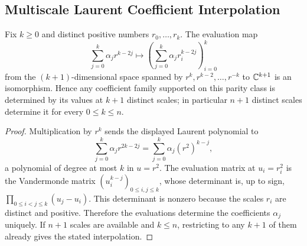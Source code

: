 \subsection{Multiscale Laurent Coefficient Interpolation}\label{subsec:multiscale-coefficient-vector-inverse}

\begin{lemma}\label{lem:parity-restricted-laurent-interpolation}
Fix \(k\ge0\) and distinct positive numbers \(r_0,
\dots,r_k\).  The evaluation map
\[
\sum_{j=0}^{k}\alpha_j r^{k-2j}
\longmapsto
\left(\sum_{j=0}^{k}\alpha_j r_i^{k-2j}\right)_{i=0}^{k}
\]
from the \((k+1)\)-dimensional space spanned by \(r^k,r^{k-2},\dots,r^{-k}\) to \(\mathbb{C}^{k+1}\) is an isomorphism.  Hence any coefficient family supported on this parity class is determined by its values at \(k+1\) distinct scales; in particular \(n+1\) distinct scales determine it for every \(0\le k\le n\).
\end{lemma}

\begin{proof}
Multiplication by \(r^k\) sends the displayed Laurent polynomial to
\[
\sum_{j=0}^{k}\alpha_j r^{2k-2j}
=\sum_{j=0}^{k}\alpha_j (r^2)^{k-j},
\]
a polynomial of degree at most \(k\) in \(u=r^2\).  The evaluation matrix at \(u_i=r_i^2\) is the Vandermonde matrix \((u_i^{k-j})_{0\le i,j\le k}\), whose determinant is, up to sign, \(\prod_{0\le i<j\le k}(u_j-u_i)\).  This determinant is nonzero because the scales \(r_i\) are distinct and positive.  Therefore the evaluations determine the coefficients \(\alpha_j\) uniquely.  If \(n+1\) scales are available and \(k\le n\), restricting to any \(k+1\) of them already gives the stated interpolation.
\end{proof}

